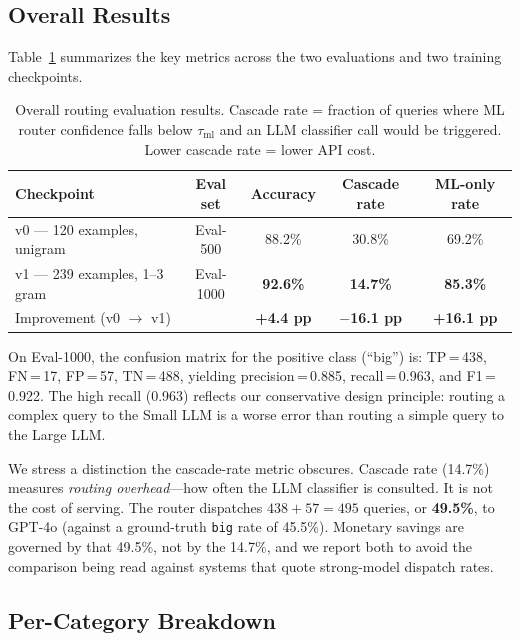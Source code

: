 \documentclass{article}
\newcommand{\largemdl}{GPT-4o}
\begin{document}
\subsection{Overall Results}
\label{sec:overall}

Table~\ref{tab:overall} summarizes the key metrics across the two
evaluations and two training checkpoints.

\begin{table}[t]
\caption{Overall routing evaluation results. Cascade rate = fraction of
queries where ML router confidence falls below $\tau_\text{ml}$ and an
LLM classifier call would be triggered. Lower cascade rate = lower API cost.}
\label{tab:overall}
\centering
\begin{tabular}{lcccc}
\toprule
\textbf{Checkpoint} & \textbf{Eval set} & \textbf{Accuracy} &
\textbf{Cascade rate} & \textbf{ML-only rate} \\
\midrule
v0 --- 120 examples, unigram & Eval-500  & 88.2\% & 30.8\% & 69.2\% \\
v1 --- 239 examples, 1--3 gram & Eval-1000 & \textbf{92.6\%} & \textbf{14.7\%} & \textbf{85.3\%} \\
\midrule
\multicolumn{2}{l}{Improvement (v0 $\rightarrow$ v1)} & \textbf{+4.4 pp} & \textbf{$-$16.1 pp} & \textbf{+16.1 pp} \\
\bottomrule
\end{tabular}
\end{table}

On Eval-1000, the confusion matrix for the positive class (``big'') is:
TP\,=\,438, FN\,=\,17, FP\,=\,57, TN\,=\,488, yielding
precision\,=\,0.885, recall\,=\,0.963, and F1\,=\,0.922.
The high recall (0.963) reflects our conservative design
principle: routing a complex query to the Small LLM is a worse error
than routing a simple query to the Large LLM.

We stress a distinction the cascade-rate metric obscures. Cascade rate
(14.7\%) measures \emph{routing overhead}---how often the LLM classifier is
consulted. It is not the cost of serving. The router dispatches
$438 + 57 = 495$ queries, or \textbf{49.5\%}, to \largemdl{} (against a
ground-truth \texttt{big} rate of 45.5\%). Monetary savings are governed by
that 49.5\%, not by the 14.7\%, and we report both to avoid the comparison
being read against systems that quote strong-model dispatch rates.

\subsection{Per-Category Breakdown}
\label{sec:percategory}
\end{document}
